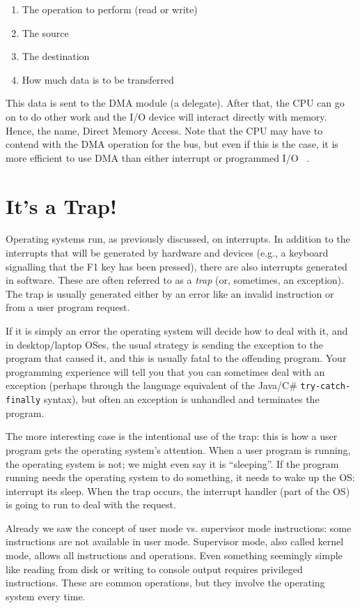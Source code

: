 \begin{enumerate}
	\item The operation to perform (read or write)
	\item The source
	\item The destination
	\item How much data is to be transferred
\end{enumerate}

This data is sent to the DMA module (a delegate). After that, the CPU can go on to do other work and the I/O device will interact directly with memory. Hence, the name, Direct Memory Access. Note that the CPU may have to contend with the DMA operation for the bus, but even if this is the case, it is more efficient to use DMA than either interrupt or programmed I/O ~\cite{osi}.

\section*{It's a Trap!}
Operating systems run, as previously discussed, on interrupts. In addition to the interrupts that will be generated by hardware and devices (e.g., a keyboard signalling that the F1 key has been pressed), there are also interrupts generated in software. These are often referred to as a \textit{trap} (or, sometimes, an exception). The trap is usually generated either by an error like an invalid instruction or from a user program request.

If it is simply an error the operating system will decide how to deal with it, and in desktop/laptop OSes, the usual strategy is sending the exception to the program that caused it, and this is usually fatal to the offending program. Your programming experience will tell you that you can sometimes deal with an exception (perhaps through the language equivalent of the Java/C\# \texttt{try-catch-finally} syntax), but often an exception is unhandled and terminates the program.

The more interesting case is the intentional use of the trap: this is how a user program gets the operating system's attention. When a user program is running, the operating system is not; we might even say it is ``sleeping''. If the program running needs the operating system to do something, it needs to wake up the OS: interrupt its sleep. When the trap occurs, the interrupt handler (part of the OS) is going to run to deal with the request.

Already we saw the concept of user mode vs. supervisor mode instructions: some instructions are not available in user mode. Supervisor mode, also called kernel mode, allows all instructions and operations. Even something seemingly simple like reading from disk or writing to console output requires privileged instructions. These are common operations, but they involve the operating system every time.

